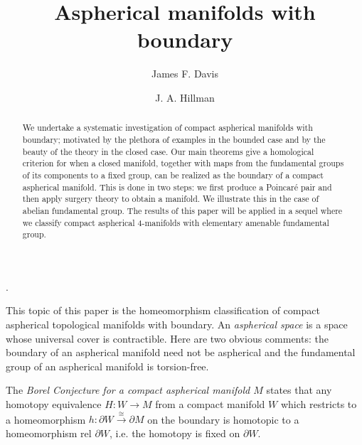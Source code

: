 \documentclass[12pt]{amsart}
\theoremstyle{definition}
\begin{document}
. 

\title{Aspherical manifolds with boundary}

\author{James F. Davis \and J. A. Hillman }
\address{{Department of Mathematics, Indiana University,}
\newline
{Bloomington, IN 47405 USA} 
\newline
{School of Mathematics and Statistics, University of Sydney,}
\newline
Sydney,  NSW 2006, Australia }


\begin{abstract}
We undertake a systematic investigation of compact aspherical manifolds with boundary; motivated by the plethora of examples in the bounded case and by the beauty of the theory in the closed case.  
Our main theorems give a homological criterion for when a closed manifold, together with maps from the fundamental groups of its components to a fixed group, can be realized as the boundary of a compact aspherical manifold.   This is done in two steps: we first produce a Poincar\'e pair and then apply surgery theory to obtain a manifold.   We illustrate this in the case of abelian fundamental group.   The results of this paper will be applied in a sequel where we classify compact aspherical 4-manifolds with elementary amenable fundamental group.
\end{abstract}






\maketitle



This topic of this paper is the homeomorphism classification of  compact aspherical topological  manifolds with boundary.   
An {\em aspherical space} is a space whose universal cover is contractible.  Here are two obvious comments: the boundary of an aspherical manifold need not be aspherical and the fundamental group of an aspherical manifold is torsion-free.  

The {\em  Borel Conjecture for a compact aspherical manifold $M$} states that any homotopy equivalence $H : W \to M$ from a compact manifold $W$ which restricts to a homeomorphism $h : \partial W \xrightarrow{\cong} \partial M$ on the boundary is homotopic to a homeomorphism rel $\partial W$, i.e. the homotopy is fixed on  $\partial W$.  
\end{document}
